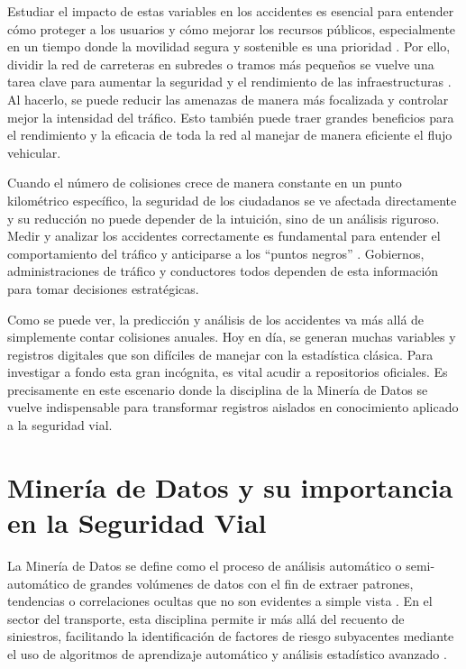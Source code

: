 \documentclass[twoside,a4paper,12pt,onecolumn,openany]{book}
\begin{document}
\vspace{0.5cm}

 Estudiar el impacto de estas variables en los accidentes es esencial para entender cómo proteger a los usuarios y cómo mejorar los recursos públicos, especialmente en un tiempo donde la movilidad segura y sostenible es una prioridad \cite{estrategiamovilidad}. Por ello, dividir la red de carreteras en subredes o tramos más pequeños se vuelve una tarea clave para aumentar la seguridad y el rendimiento de las infraestructuras \cite{hsm_aashto}. Al hacerlo, se puede reducir las amenazas de manera más focalizada y controlar mejor la intensidad del tráfico. Esto también puede traer grandes beneficios para el rendimiento y la eficacia de toda la red al manejar de manera eficiente el flujo vehicular.

\vspace{0.5cm}

Cuando el número de colisiones crece de manera constante en un punto kilométrico específico, la seguridad de los ciudadanos se ve afectada directamente y su reducción no puede depender de la intuición, sino de un análisis riguroso. Medir y analizar los accidentes correctamente es fundamental para entender el comportamiento del tráfico y anticiparse a los ``puntos negros'' \cite{tca_dgt}. Gobiernos, administraciones de tráfico y conductores todos dependen de esta información para tomar decisiones estratégicas.

\vspace{0.5cm}

Como se puede ver, la predicción y análisis de los accidentes va más allá de simplemente contar colisiones anuales. Hoy en día, se generan muchas variables y registros digitales que son difíciles de manejar con la estadística clásica. Para investigar a fondo esta gran incógnita, es vital acudir a repositorios oficiales. Es precisamente en este escenario donde la disciplina de la Minería de Datos se vuelve indispensable para transformar registros aislados en conocimiento aplicado a la seguridad vial.

\vspace{0.5cm}
\section{Minería de Datos y su importancia en la Seguridad Vial}
\vspace{0.5cm}

La Minería de Datos se define como el proceso de análisis automático o semi-automático de grandes volúmenes de datos con el fin de extraer patrones, tendencias o correlaciones ocultas que no son evidentes a simple vista \cite{datamining}. En el sector del transporte, esta disciplina permite ir más allá del recuento de siniestros, facilitando la identificación de factores de riesgo subyacentes mediante el uso de algoritmos de aprendizaje automático y análisis estadístico avanzado \cite{dataminingibm}.
\end{document}
